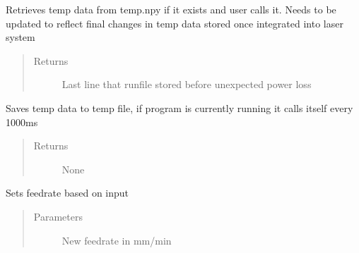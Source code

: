 \documentclass[letterpaper,10pt,english]{sphinxmanual}
\begin{document}
\begin{fulllineitems}
\begin{fulllineitems}
\label{\detokenize{index:droogCNC.TwoAxisStage.__retrieveTempData}}
\sphinxAtStartPar
Retrieves temp data from temp.npy if it exists and user calls it. Needs to be updated
to reflect final changes in temp data stored once integrated into laser system
\begin{quote}\begin{description}
\item[{Returns}] \leavevmode
\sphinxAtStartPar
Last line that runfile stored before unexpected power loss

\end{description}\end{quote}

\end{fulllineitems}


\begin{fulllineitems}
\label{\detokenize{index:droogCNC.TwoAxisStage.__saveTempData}}
\sphinxAtStartPar
Saves temp data to temp file, if program is currently running it calls itself every 1000ms
\begin{quote}\begin{description}
\item[{Returns}] \leavevmode
\sphinxAtStartPar
None

\end{description}\end{quote}

\end{fulllineitems}


\begin{fulllineitems}
\label{\detokenize{index:droogCNC.TwoAxisStage.__setFeed}}
\sphinxAtStartPar
Sets feedrate based on input
\begin{quote}\begin{description}
\item[{Parameters}] \leavevmode
\sphinxAtStartPar
{} \textendash{} New feedrate in mm/min


\end{description}
\end{quote}
\end{fulllineitems}
\end{fulllineitems}
\end{document}
